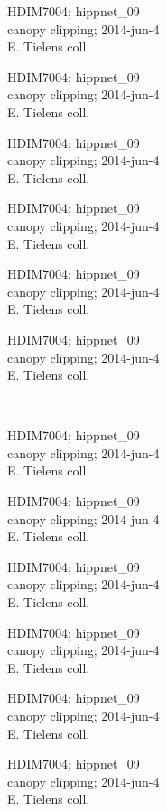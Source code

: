 \documentclass[2pt]{extarticle}
\begin{document}
\noindent
\parbox{0.16\textwidth}{\tiny \raggedright \rule[-0.3\baselineskip]{0pt}{10pt}HDIM7004; hippnet\_09\\ canopy clipping; 2014-jun-4\\ E. Tielens coll.}
\parbox{0.16\textwidth}{\tiny \raggedright \rule[-0.3\baselineskip]{0pt}{10pt}HDIM7004; hippnet\_09\\ canopy clipping; 2014-jun-4\\ E. Tielens coll.}
\parbox{0.16\textwidth}{\tiny \raggedright \rule[-0.3\baselineskip]{0pt}{10pt}HDIM7004; hippnet\_09\\ canopy clipping; 2014-jun-4\\ E. Tielens coll.}
\parbox{0.16\textwidth}{\tiny \raggedright \rule[-0.3\baselineskip]{0pt}{10pt}HDIM7004; hippnet\_09\\ canopy clipping; 2014-jun-4\\ E. Tielens coll.}
\parbox{0.16\textwidth}{\tiny \raggedright \rule[-0.3\baselineskip]{0pt}{10pt}HDIM7004; hippnet\_09\\ canopy clipping; 2014-jun-4\\ E. Tielens coll.}
\parbox{0.16\textwidth}{\tiny \raggedright \rule[-0.3\baselineskip]{0pt}{10pt}HDIM7004; hippnet\_09\\ canopy clipping; 2014-jun-4\\ E. Tielens coll.} \\ 
\vspace{0.001in} 

\noindent
\parbox{0.16\textwidth}{\tiny \raggedright \rule[-0.3\baselineskip]{0pt}{10pt}HDIM7004; hippnet\_09\\ canopy clipping; 2014-jun-4\\ E. Tielens coll.}
\parbox{0.16\textwidth}{\tiny \raggedright \rule[-0.3\baselineskip]{0pt}{10pt}HDIM7004; hippnet\_09\\ canopy clipping; 2014-jun-4\\ E. Tielens coll.}
\parbox{0.16\textwidth}{\tiny \raggedright \rule[-0.3\baselineskip]{0pt}{10pt}HDIM7004; hippnet\_09\\ canopy clipping; 2014-jun-4\\ E. Tielens coll.}
\parbox{0.16\textwidth}{\tiny \raggedright \rule[-0.3\baselineskip]{0pt}{10pt}HDIM7004; hippnet\_09\\ canopy clipping; 2014-jun-4\\ E. Tielens coll.}
\parbox{0.16\textwidth}{\tiny \raggedright \rule[-0.3\baselineskip]{0pt}{10pt}HDIM7004; hippnet\_09\\ canopy clipping; 2014-jun-4\\ E. Tielens coll.}
\parbox{0.16\textwidth}{\tiny \raggedright \rule[-0.3\baselineskip]{0pt}{10pt}HDIM7004; hippnet\_09\\ canopy clipping; 2014-jun-4\\ E. Tielens coll.} \\ 
\vspace{0.001in} 
\end{document}
